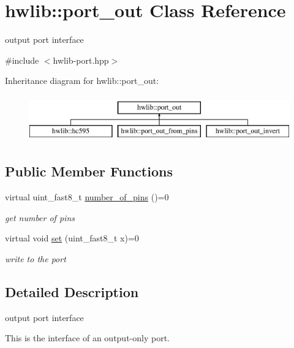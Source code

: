 \hypertarget{classhwlib_1_1port__out}{}\section{hwlib\+:\+:port\+\_\+out Class Reference}
\label{classhwlib_1_1port__out}


output port interface  




{\ttfamily \#include $<$hwlib-\/port.\+hpp$>$}

Inheritance diagram for hwlib\+:\+:port\+\_\+out\+:\begin{figure}[H]
\begin{center}
\leavevmode
\includegraphics[height=2.000000cm]{classhwlib_1_1port__out}
\end{center}
\end{figure}
\subsection*{Public Member Functions}
\begin{DoxyCompactItemize}
\item 
virtual uint\+\_\+fast8\+\_\+t \hyperlink{classhwlib_1_1port__out_a8593e2ff755b938797defb06c1e085df}{number\+\_\+of\+\_\+pins} ()=0
\begin{DoxyCompactList}\small\item\em get number of pins \end{DoxyCompactList}\item 
virtual void \hyperlink{classhwlib_1_1port__out_ad086f5dd66f293118df6ab979feb64fc}{set} (uint\+\_\+fast8\+\_\+t x)=0
\begin{DoxyCompactList}\small\item\em write to the port \end{DoxyCompactList}\end{DoxyCompactItemize}


\subsection{Detailed Description}
output port interface 

This is the interface of an output-\/only port. 

